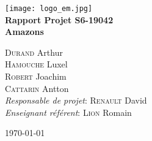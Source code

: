 \begin{titlepage}
    \begin{center}
        \vspace*{\fill}

        \texttt{[image: logo\_em.jpg]}~\\[3cm]
        
        {\Huge \bfseries Rapport Projet S6-19042\\Amazons\\[0.5cm]}
        
        \large \textsc{Durand} Arthur \\ \textsc{Hamouche} Luxel \\ \textsc{Robert} Joachim \\ \textsc{Cattarin} Antton \\[3cm]
        
        \large
        \emph{Responsable de projet}: \textsc{Renault} David \\
        \emph{Enseignant référent}: \textsc{Lion} Romain
        
        \vspace*{\fill}
        
        \large \today
    \end{center}
\end{titlepage}